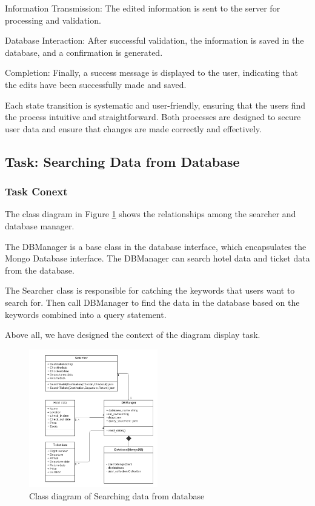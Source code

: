 \documentclass[conference]{IEEEtran}
\begin{document}
Information Transmission: The edited information is sent to the server for processing and validation.

Database Interaction: After successful validation, the information is saved in the database, and a confirmation is generated.

Completion: Finally, a success message is displayed to the user, indicating that the edits have been successfully made and saved.

Each state transition is systematic and user-friendly, ensuring that the users find the process intuitive and straightforward. Both processes are designed to secure user data and ensure that changes are made correctly and effectively.



\subsection{\textbf{Task: Searching Data from Database }}


\subsubsection{\textbf{Task Conext }}

\textbf{}

The class diagram in Figure \ref{class1} shows the relationships among the searcher and database manager. 

The DBManager is a base class in the database interface, which encapsulates the Mongo Database interface. The DBManager can search hotel data and ticket data from the database.

The Searcher class is responsible for catching the keywords that users want to search for. Then call DBManager to find the data in the database based on the keywords combined into a query statement.

Above all, we have designed the context of the diagram display task.
\begin{figure}[htbp]
	\centerline{\includegraphics[width=0.5\textwidth]{image/searching hotel class1.pdf}}
	\caption{Class diagram of Searching data from database }
	\label{class1}
\end{figure}
\end{document}
